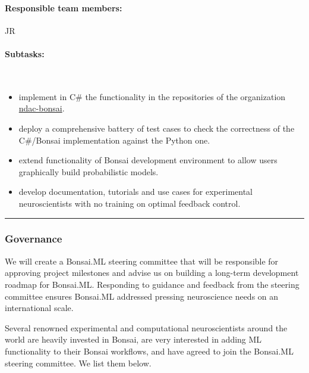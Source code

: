 \paragraph{Responsible team members:} JR

\paragraph{Subtasks:}\mbox{}\\

\begin{itemize}

    \item implement in C\# the functionality in the repositories of the
        organization \href{https://github.com/ndac-bonsai}{ndac-bonsai}.

    \item deploy a comprehensive battery of test cases to check the correctness
        of the C\#/Bonsai implementation against the Python one.

    \item extend functionality of Bonsai development environment to allow users
        graphically build probabilistic models.

    \item develop documentation, tutorials and use cases for experimental
        neuroscientists with no training on optimal feedback control.

\end{itemize}

\noindent\rule{\textwidth}{1pt}
\subsubsection*{Governance}

We will create a Bonsai.ML steering committee that will be responsible for
approving project milestones and advise us on building a long-term development
roadmap for Bonsai.ML.
%
Responding to guidance and feedback from the steering committee ensures
Bonsai.ML addressed pressing neuroscience needs on an international scale.

Several renowned experimental and computational neuroscientists around the
world are heavily invested in Bonsai, are very interested in adding ML
functionality to their Bonsai workflows, and have agreed to join the Bonsai.ML
steering committee. We list them below.

